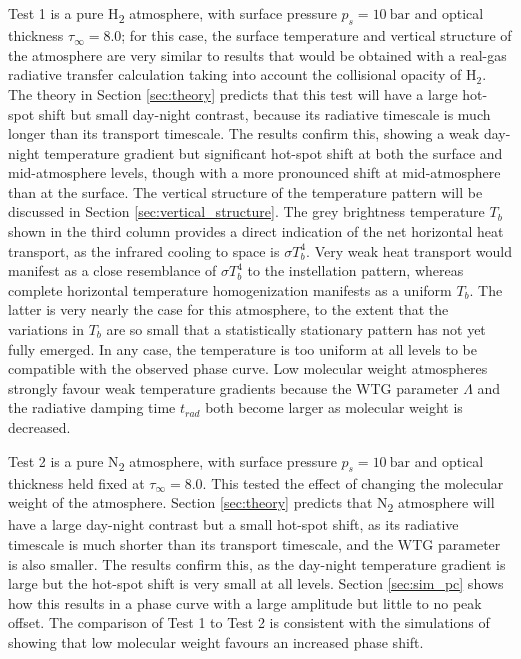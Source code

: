 Test 1 is a pure H\textsubscript{2} atmosphere, with surface pressure $p_{s} = 10\ \mathrm{bar}$ and optical thickness $\tau_{\infty}= 8.0$; for this case, the surface temperature and vertical structure of the atmosphere are very similar to results that would be obtained with a real-gas radiative transfer calculation taking into account the collisional opacity of $\mathrm{H_2}$. The theory in Section \ref{sec:theory} predicts that this test will have a large hot-spot shift but small day-night contrast, because its radiative timescale is much longer than its transport timescale. The results confirm this, showing a weak day-night temperature gradient but significant hot-spot shift at both the surface and mid-atmosphere levels, though with a more pronounced shift at mid-atmosphere than at the surface. The vertical structure of the temperature pattern will be discussed in Section \ref{sec:vertical_structure}.  The grey brightness temperature $T_{b}$ shown in the third column provides a direct indication of the net horizontal heat transport, as the infrared cooling to space is $\sigma T_{b}^{4}$. Very weak heat transport would manifest as a close resemblance of $\sigma T_{b}^{4}$ to the instellation pattern, whereas complete horizontal temperature homogenization manifests as a uniform $T_{b}$. The latter is very nearly the case for this atmosphere, to the extent that the variations in $T_{b}$ are so small that a statistically stationary pattern has not yet fully emerged. In any case, the temperature is too uniform at all levels to be compatible with the observed phase curve.
Low molecular weight atmospheres strongly favour weak temperature gradients because the WTG parameter $\Lambda$ and the radiative damping time $t_{rad}$ both become larger as molecular weight is decreased.

Test 2 is a pure N\textsubscript{2} atmosphere, with surface pressure $p_{s} = 10\ \mathrm{bar}$ and optical thickness held fixed at $\tau_{\infty}= 8.0$. This tested the effect of changing the molecular weight of the atmosphere. Section \ref{sec:theory} predicts that N\textsubscript{2} atmosphere will have a large day-night contrast but a small hot-spot shift, as its radiative timescale is much shorter than its transport timescale, and the WTG parameter is also smaller.  The results confirm this, as the day-night temperature gradient is large but the hot-spot shift is very small at all levels. Section \ref{sec:sim_pc} shows how this results in a phase curve with a large amplitude but little to no peak offset. The comparison of Test 1 to Test 2 is consistent with the simulations of \citet{kataria2014atmospheric} showing that low molecular weight favours an increased phase shift.

